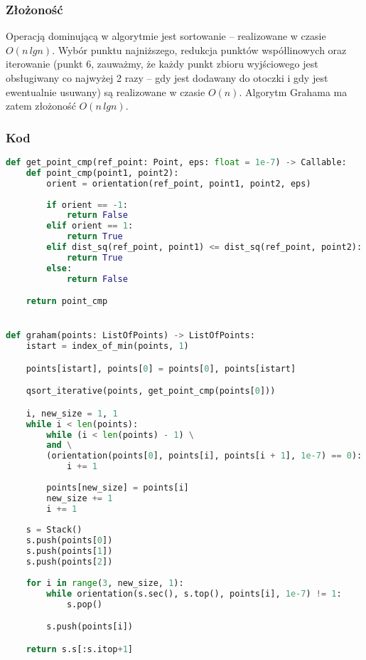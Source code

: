 \documentclass[11pt]{article}
\theoremstyle{remark} \newtheorem{definition}{def.}
\theoremstyle{definition} \newtheorem{twierdzenie}{tw.}
\begin{document}
    \subsubsection{Złożoność}
    
    Operacją dominującą w algorytmie jest sortowanie -- realizowane w czasie $O(n \, lgn)$. Wybór punktu najniższego, redukcja punktów współlinowych oraz iterowanie (punkt 6, 
    zauważmy, że każdy punkt zbioru wyjściowego jest obsługiwany co najwyżej 2 razy -- gdy jest dodawany do otoczki i gdy jest ewentualnie usuwany) są realizowane w
    czasie $O(n)$. Algorytm Grahama ma zatem złożoność $O(n \, lgn)$.


    \subsubsection{Kod}


    \begin{lstlisting}[language=Python]
def get_point_cmp(ref_point: Point, eps: float = 1e-7) -> Callable:
    def point_cmp(point1, point2):
        orient = orientation(ref_point, point1, point2, eps)
        
        if orient == -1:
            return False
        elif orient == 1:
            return True
        elif dist_sq(ref_point, point1) <= dist_sq(ref_point, point2):
            return True
        else:
            return False

    return point_cmp


def graham(points: ListOfPoints) -> ListOfPoints:
    istart = index_of_min(points, 1)

    points[istart], points[0] = points[0], points[istart]    

    qsort_iterative(points, get_point_cmp(points[0]))

    i, new_size = 1, 1
    while i < len(points):
        while (i < len(points) - 1) \
        and \
        (orientation(points[0], points[i], points[i + 1], 1e-7) == 0):  
            i += 1
        
        points[new_size] = points[i]
        new_size += 1
        i += 1
    
    s = Stack()
    s.push(points[0])
    s.push(points[1])
    s.push(points[2])
    
    for i in range(3, new_size, 1):
        while orientation(s.sec(), s.top(), points[i], 1e-7) != 1:
            s.pop()

        s.push(points[i])

    return s.s[:s.itop+1]
        
    \end{lstlisting}
\end{document}
